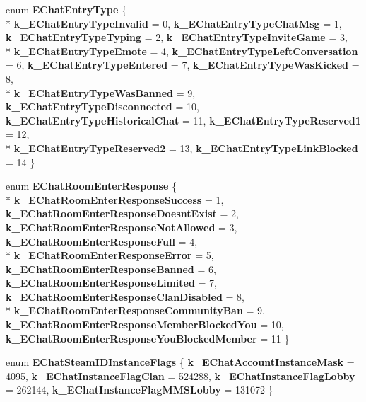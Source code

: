 \begin{DoxyCompactItemize}
\item 
\hypertarget{namespaceValve_1_1Steamworks_a4589b46bf69e3cd9f517767972692b2d}{}enum {\bfseries E\+Chat\+Entry\+Type} \{ \\*
{\bfseries k\+\_\+\+E\+Chat\+Entry\+Type\+Invalid} = 0, 
{\bfseries k\+\_\+\+E\+Chat\+Entry\+Type\+Chat\+Msg} = 1, 
{\bfseries k\+\_\+\+E\+Chat\+Entry\+Type\+Typing} = 2, 
{\bfseries k\+\_\+\+E\+Chat\+Entry\+Type\+Invite\+Game} = 3, 
\\*
{\bfseries k\+\_\+\+E\+Chat\+Entry\+Type\+Emote} = 4, 
{\bfseries k\+\_\+\+E\+Chat\+Entry\+Type\+Left\+Conversation} = 6, 
{\bfseries k\+\_\+\+E\+Chat\+Entry\+Type\+Entered} = 7, 
{\bfseries k\+\_\+\+E\+Chat\+Entry\+Type\+Was\+Kicked} = 8, 
\\*
{\bfseries k\+\_\+\+E\+Chat\+Entry\+Type\+Was\+Banned} = 9, 
{\bfseries k\+\_\+\+E\+Chat\+Entry\+Type\+Disconnected} = 10, 
{\bfseries k\+\_\+\+E\+Chat\+Entry\+Type\+Historical\+Chat} = 11, 
{\bfseries k\+\_\+\+E\+Chat\+Entry\+Type\+Reserved1} = 12, 
\\*
{\bfseries k\+\_\+\+E\+Chat\+Entry\+Type\+Reserved2} = 13, 
{\bfseries k\+\_\+\+E\+Chat\+Entry\+Type\+Link\+Blocked} = 14
 \}\label{namespaceValve_1_1Steamworks_a4589b46bf69e3cd9f517767972692b2d}

\item 
\hypertarget{namespaceValve_1_1Steamworks_ad7ba016b077bdd46597dadc5100ed588}{}enum {\bfseries E\+Chat\+Room\+Enter\+Response} \{ \\*
{\bfseries k\+\_\+\+E\+Chat\+Room\+Enter\+Response\+Success} = 1, 
{\bfseries k\+\_\+\+E\+Chat\+Room\+Enter\+Response\+Doesnt\+Exist} = 2, 
{\bfseries k\+\_\+\+E\+Chat\+Room\+Enter\+Response\+Not\+Allowed} = 3, 
{\bfseries k\+\_\+\+E\+Chat\+Room\+Enter\+Response\+Full} = 4, 
\\*
{\bfseries k\+\_\+\+E\+Chat\+Room\+Enter\+Response\+Error} = 5, 
{\bfseries k\+\_\+\+E\+Chat\+Room\+Enter\+Response\+Banned} = 6, 
{\bfseries k\+\_\+\+E\+Chat\+Room\+Enter\+Response\+Limited} = 7, 
{\bfseries k\+\_\+\+E\+Chat\+Room\+Enter\+Response\+Clan\+Disabled} = 8, 
\\*
{\bfseries k\+\_\+\+E\+Chat\+Room\+Enter\+Response\+Community\+Ban} = 9, 
{\bfseries k\+\_\+\+E\+Chat\+Room\+Enter\+Response\+Member\+Blocked\+You} = 10, 
{\bfseries k\+\_\+\+E\+Chat\+Room\+Enter\+Response\+You\+Blocked\+Member} = 11
 \}\label{namespaceValve_1_1Steamworks_ad7ba016b077bdd46597dadc5100ed588}

\item 
\hypertarget{namespaceValve_1_1Steamworks_a49b252dd7c672f37627b509de17bffff}{}enum {\bfseries E\+Chat\+Steam\+I\+D\+Instance\+Flags} \{ {\bfseries k\+\_\+\+E\+Chat\+Account\+Instance\+Mask} = 4095, 
{\bfseries k\+\_\+\+E\+Chat\+Instance\+Flag\+Clan} = 524288, 
{\bfseries k\+\_\+\+E\+Chat\+Instance\+Flag\+Lobby} = 262144, 
{\bfseries k\+\_\+\+E\+Chat\+Instance\+Flag\+M\+M\+S\+Lobby} = 131072
 \}\label{namespaceValve_1_1Steamworks_a49b252dd7c672f37627b509de17bffff}


\end{DoxyCompactItemize}
